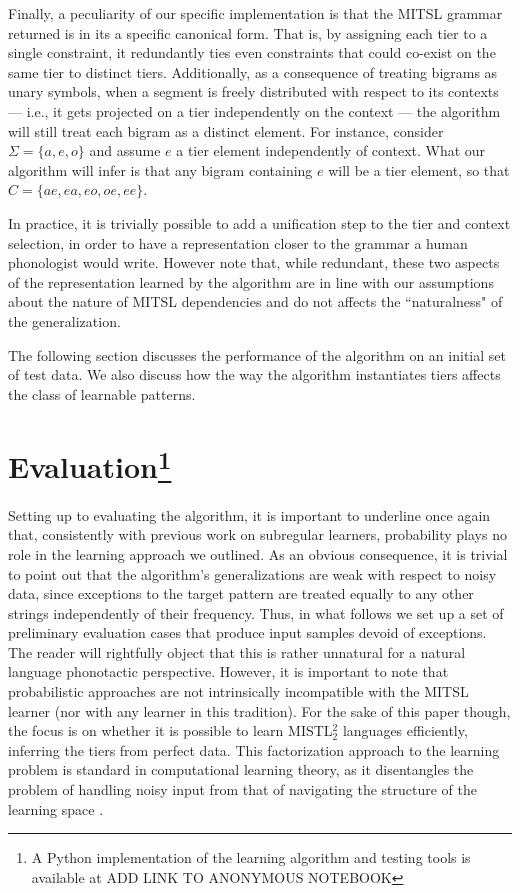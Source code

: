 \documentclass[11pt,a4paper]{article}
\begin{document}
Finally, a peculiarity of our specific implementation is that the MITSL grammar returned is in its a specific canonical form.
That is, by assigning each tier to a single constraint,  it redundantly ties even  constraints that could co-exist on the same tier to distinct tiers.
Additionally, as a consequence of treating bigrams as unary symbols,  when a segment is freely distributed with respect to its contexts --- i.e., it gets projected on a tier independently on the context --- the algorithm will still treat each bigram as a distinct element.
For instance, consider $\Sigma =\{ a, e, o \}$ and assume  $e$ a tier element independently of context.
What our algorithm will infer is that any bigram containing $e$ will be a tier element, so that $C = \{ ae, ea, eo, oe, ee\}$.

In practice, it is trivially possible to add a unification step to the tier and context selection, in order to have a representation closer to the grammar a human phonologist would write.
However note that, while redundant, these two aspects of the representation learned by the algorithm are in line with our assumptions about the nature of MITSL dependencies and do not affects the ``naturalness" of the generalization.

The following section discusses the performance of the algorithm on an initial set of test data.
We also discuss how the way the algorithm instantiates tiers affects the class of learnable patterns.


\section{Evaluation\footnote{A Python implementation of the learning algorithm and testing tools is available at ADD LINK TO ANONYMOUS NOTEBOOK}}

Setting up to evaluating the algorithm, it is important to underline once again that, consistently with previous work on subregular learners,  probability plays no role in the learning approach we outlined.
As an obvious consequence, it is trivial to point out that the algorithm's generalizations are weak with respect to noisy data, since exceptions to the target pattern are treated equally to any other strings independently of their frequency.
Thus, in what follows we set up a set of preliminary evaluation cases that produce input samples devoid of exceptions.
The reader will rightfully object that this is rather unnatural for a natural language phonotactic perspective.
However, it is important to note that probabilistic approaches are not intrinsically incompatible with the MITSL learner (nor with any learner in this tradition).
For the sake of this paper though, the focus is on whether it is possible to learn MISTL$^2_2$ languages efficiently, inferring the tiers from perfect data.
This  factorization approach to the learning problem is standard in computational learning theory, as it disentangles the problem of handling noisy input from that of navigating the structure of the learning space \cite[a.o.]{OncinaGarcia91,jardine2016learning,JardineHeinz16}.
\end{document}

